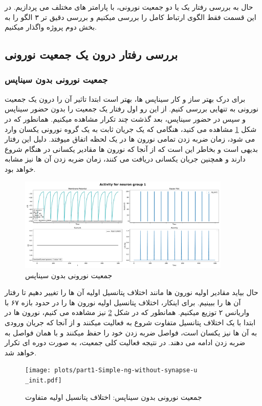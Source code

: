 \documentclass{report}
\begin{document}
    حال به بررسی رفتار یک یا دو جمعیت نورونی، با پارامتر های مختلف می پردازیم. در این قسمت فقط الگوی ارتباط کامل را بررسی میکنیم و بررسی دقیق تر ۳ الگو را به بخش دوم پروژه واگذار میکنیم.
    \subsection{بررسی رفتار درون یک جمعیت نورونی}
        \subsubsection*{جمعیت نورونی بدون سیناپس}
        برای درک بهتر ساز و کار سیناپس ها، بهتر است ابتدا تاثیر آن را درون یک جمعیت نورونی به تنهایی بررسی کنیم. از این رو اول رفتار یک جمعیت را بدون حضور سیناپس و سپس در حضور سیناپس، بعد گذشت چند تکرار مشاهده میکنیم. 
        همانطور که در شکل 
        \ref{fig:part1-simple-ng}
        مشاهده می کنید، هنگامی که یک جریان ثابت به یک گروه نورونی یکسان وارد می شود، زمان ضربه زدن تمامی نورون ها در یک لحظه اتفاق میوفتد. دلیل این رفتار بدیهی است و بخاطر این است که از آنجا که نورون ها مقادیر یکسانی در هنگام شروع دارند و همچنین جریان یکسانی دریافت می کنند، زمان ضربه زدن آن ها نیز مشابه خواهد بود.
        \begin{figure}[!ht]
            \centering
            \includegraphics[width=0.9\textwidth]{plots/part1-Simple-ng-without-synapse.pdf} 
            \caption{جمعیت نورونی بدون سیناپس}
            \label{fig:part1-simple-ng}
        \end{figure}

        حال بیاید مقادیر اولیه نورون ها مانند اختلاف پتانسیل اولیه آن ها را تغییر دهیم تا رفتار آن ها را ببینیم. برای اینکار، اختلاف پتانسیل اولیه نورون ها را در حدود بازه ۶۷ با واریانس ۲ توزیع میکنیم. همانطور که در شکل
        \ref{fig:part1-simple-ng-u-init}
        نیز مشاهده می کنیم، نورون ها در ابتدا با یک اختلاف پتانسیل متفاوت شروع به فعالیت میکنند و از آنجا که جریان ورودی به آن ها نیز یکسان است، فواصل ضربه زدن خود را حفظ میکنند و با همان فواصل به ضربه زدن ادامه می دهند. در نتیجه فعالیت کلی جمعیت، به صورت دوره ای تکرار خواهد شد.
        \begin{figure}[!ht]
            \centering
            \texttt{[image: plots/part1-Simple-ng-without-synapse-u\\\_init.pdf]} 
            \caption{جمعیت نورونی بدون سیناپس: اختلاف پتانسیل اولیه متفاوت}
            \label{fig:part1-simple-ng-u-init}
        \end{figure}
\end{document}
